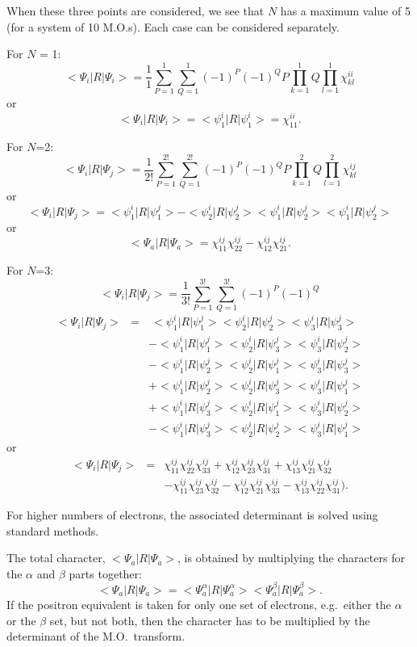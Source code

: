 When these three points are considered, we see that $N$ has a maximum value  of
5 (for a system of 10 M.O.s).  Each case can be considered separately.
\begin{description}
\item{For $N$ = 1:}
$$
<\Psi_i|R|\Psi_i> = \frac{1}{1}\sum_{P=1}^{1} \sum_{Q=1}^{1}(-1)^P(-1)^Q
P\prod_{k=1}^{1}Q\prod_{l=1}^{1}\chi_{kl}^{ii}
$$
or
$$
<\Psi_i|R|\Psi_i> = <\psi_1^i|R|\psi_1^i> = \chi_{11}^{ii}.
$$
\item{For $N$=2:}
$$
<\Psi_i|R|\Psi_j> = \frac{1}{2!}\sum_{P=1}^{2!} \sum_{Q=1}^{2!}(-1)^P(-1)^Q
P\prod_{k=1}^{2}Q\prod_{l=1}^{2}\chi_{kl}^{ij}
$$
or 
$$
<\Psi_i|R|\Psi_j> = <\psi_1^i|R|\psi_1^j>-<\psi_2^i|R|\psi_2^j>
<\psi_1^i|R|\psi_2^j><\psi_1^i|R|\psi_2^j>
$$
or
$$
<\Psi_a|R|\Psi_a> = \chi_{11}^{ij}\chi_{22}^{ij}-\chi_{12}^{ij}\chi_{21}^{ij}.
$$        
\item{For $N$=3:}
$$
<\Psi_i|R|\Psi_j> = \frac{1}{3!}\sum_{P=1}^{3!} \sum_{Q=1}^{3!}(-1)^P(-1)^Q
$$
\begin{eqnarray}
<\Psi_i|R|\Psi_j>& = &\ <\psi_1^i|R|\psi_1^j><\psi_2^i|R|\psi_2^j><\psi_3^i|R|\psi_3^j> \nonumber   \\
&&-<\psi_1^i|R|\psi_1^j><\psi_2^i|R|\psi_3^j><\psi_3^i|R|\psi_2^j> \nonumber  \\
&&-<\psi_1^i|R|\psi_2^j><\psi_2^i|R|\psi_1^j><\psi_3^i|R|\psi_3^j> \nonumber  \\
&&+<\psi_1^i|R|\psi_2^j><\psi_2^i|R|\psi_3^j><\psi_3^i|R|\psi_1^j> \nonumber  \\
&&+<\psi_1^i|R|\psi_3^j><\psi_2^i|R|\psi_1^j><\psi_3^i|R|\psi_2^j> \nonumber  \\
&&-<\psi_1^i|R|\psi_3^j><\psi_2^i|R|\psi_2^j><\psi_3^i|R|\psi_1^j>  \nonumber
\end{eqnarray}
or
\begin{eqnarray}
<\Psi_i|R|\Psi_j>&=&\chi_{11}^{ij}\chi_{22}^{ij}\chi_{33}^{ij}+
                            \chi_{12}^{ij}\chi_{23}^{ij}\chi_{31}^{ij}+
                            \chi_{13}^{ij}\chi_{21}^{ij}\chi_{32}^{ij} \nonumber \\
&&-\chi_{11}^{ij}\chi_{23}^{ij}\chi_{32}^{ij}
-\chi_{12}^{ij}\chi_{21}^{ij}\chi_{33}^{ij}
-\chi_{13}^{ij}\chi_{22}^{ij}\chi_{31}^{ij}). \nonumber
\end{eqnarray}
\end{description}

For higher numbers of electrons, the associated determinant is solved using
standard methods. 

The total character, $<\Psi_a|R|\Psi_a>$, is obtained by multiplying the
characters for the $\alpha$ and $\beta$ parts together:
$$
<\Psi_a|R|\Psi_a> = <\Psi_a^{\alpha}|R|\Psi_a^{\alpha}>
<\Psi_a^{\beta}|R|\Psi_a^{\beta}>.
$$
If the positron equivalent is taken for only one set of electrons, e.g.\ either
the $\alpha$ or the $\beta$ set, but not both, then the  character has  to be
multiplied by the determinant of the M.O.\ transform.

